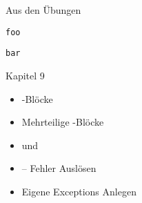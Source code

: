 
\begin{frame}[fragile]{Aus den Übungen}
%
\begin{tcbraster}[raster columns=2,
                  raster equal height,
                  nobeforeafter,
                  raster column skip=0.5cm]
\begin{codebox}
\begin{verbatim}
foo
\end{verbatim}
\end{codebox}
%
\begin{codebox}
\begin{verbatim}
bar
\end{verbatim}
\end{codebox}
\end{tcbraster}
%
\end{frame}


\begin{frame}[fragile]{Kapitel 9}
%
\begin{itemize}
\item {}-Blöcke
\item Mehrteilige -Blöcke
\item {} und 
\item {} -- Fehler Auslösen 
\item Eigene Exceptions Anlegen
\end{itemize}
%
\end{frame}


